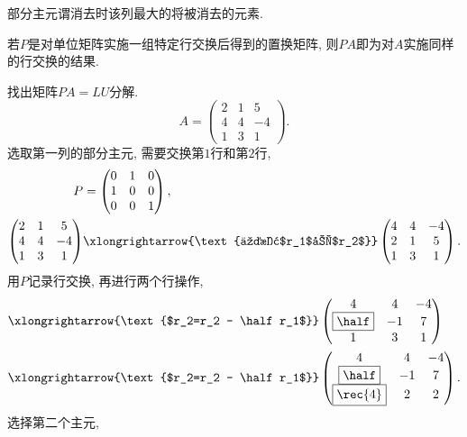 \documentclass{ctexart}
\begin{document}
\begin{definition}
    部分主元谓消去时该列最大的将被消去的元素.
\end{definition}
\begin{theorem}
    若$P$是对单位矩阵实施一组特定行交换后得到的置换矩阵, 则$PA$即为对$A$实施同样的行交换的结果.
\end{theorem}
\begin{ex}
    找出矩阵$PA=LU$分解.
    \[ A = \begin{pmatrix}
        2 & 1 & 5 \\ 4 & 4 & -4 \\ 1 & 3 & 1
    \end{pmatrix}. \]
    选取第一列的部分主元, 需要交换第$1$行和第$2$行,
    \begin{align*}
        P &= \begin{pmatrix}
            0 & 1 & 0 \\ 1 & 0 & 0 \\ 0 & 0 & 1
        \end{pmatrix}, \\
        \begin{pmatrix}
            2 & 1 & 5 \\ 4 & 4 & -4 \\ 1 & 3 & 1
        \end{pmatrix} &\xlongrightarrow{\text{交换$r_1$和$r_2$}} \begin{pmatrix}
            4 & 4 & -4 \\ 2 & 1 & 5 \\ 1 & 3 & 1
        \end{pmatrix}.
    \end{align*}
    用$P$记录行交换, 再进行两个行操作,
    \begin{align*}
        & \xlongrightarrow{\text{$r_2=r_2 - \half r_1$}} \begin{pmatrix}
            4 & 4 & -4 \\ \boxed{\half} & -1 & 7 \\ 1 & 3 & 1
        \end{pmatrix} \\
        & \xlongrightarrow{\text{$r_2=r_2 - \half r_1$}} \begin{pmatrix}
            4 & 4 & -4 \\ \boxed{\half} & -1 & 7 \\ \boxed{\rec{4}} & 2 & 2
        \end{pmatrix}.
    \end{align*}
    选择第二个主元,
    \begin{align*}

\end{align*}
\end{ex}
\end{document}
